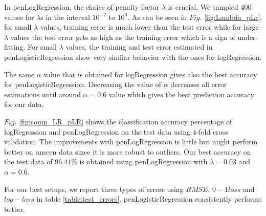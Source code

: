 In penLogRegression, the choice of penalty factor $\lambda$ is crucial. We sampled 400 values for $\lambda$s in the interval  $10^{-2}$ to $10^3$. As can be seen in $Fig.$ \ref{fig:Lambda_pLr}, for small $\lambda$ values, training error is much lower than the test error while for large $\lambda$ values the test error gets as high as the training error which is a sign of under-fitting. 
For small $\lambda$ values, the training and test error estimated in penLogisticRegression show very similar behavior with the ones for logRegression. 

The same $\alpha$ value that is obtained for logRegression gives also the best accuracy for penLogisticRegression. Decreasing the value of $\alpha$ decreases all error estimations until around $\alpha=0.6$ value which gives the best prediction accuracy for our data.

$Fig.$ \ref{fig:comp_LR_pLR} shows the classification accuracy percentage of logRegression and penLogRegression on the test data using 4-fold cross validation. The improvements with penLogRegression is little but might perform better on unseen data since it is more robust to outliers. Our best accuracy on the test data of $96.41\%$  is obtained using penLogRegression with $\lambda=0.03$ and $\alpha=0.6$. 

For our best setups, we report three types of errors using $RMSE$, $0-1 loss$ and $log-loss$  in table \ref{table:test_errors}. penLogisticRegression consistently performs better.

